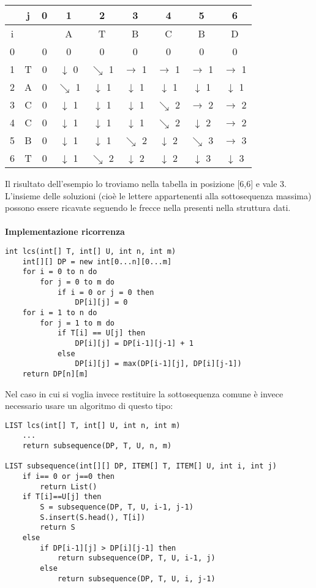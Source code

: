 \documentclass[../cheatSheetAlgoritmi.tex]{subfiles}
\begin{document}
\begin{center}
	\renewcommand{\arraystretch}{1.2}
	\begin{tabular}{ |c|c|c|c|c|c|c|c|c| } 
		\hline
			&j &0 &1 &2 &3 &4 &5 &6\\
		\hline
			i & & &A &T &B &C &B &D\\
		\hline
			0 & &0 &0 &0 &0 &0 &0 &0\\
		\hline
			1 &T &0 & $\downarrow$ 0 & $\searrow$ 1 & $\rightarrow$ 1 & $\rightarrow$ 1 & $\rightarrow$ 1 & $\rightarrow$ 1\\
		\hline
			2 &A &0 & $\searrow$ 1 & $\downarrow$ 1 & $\downarrow$ 1 & $\downarrow$ 1 & $\downarrow$ 1 & $\downarrow$ 1\\
		\hline
			3 &C &0 & $\downarrow$ 1 & $\downarrow$ 1 & $\downarrow$ 1 & $\searrow$ 2 & $\rightarrow$ 2 & $\rightarrow$ 2\\
		\hline
			4 &C &0 & $\downarrow$ 1 & $\downarrow$ 1 & $\downarrow$ 1 & $\searrow$ 2 & $\downarrow$ 2 & $\rightarrow$ 2\\
		\hline
			5 &B &0 & $\downarrow$ 1 & $\downarrow$ 1 & $\searrow$ 2 & $\downarrow$ 2 & $\searrow$ 3 & $\rightarrow$ 3\\
		\hline
			6 &T &0 & $\downarrow$ 1 & $\searrow$ 2 & $\downarrow$ 2 & $\downarrow$ 2 & $\downarrow$ 3 & $\downarrow$ 3\\
			\hline
	\end{tabular}
\end{center}
Il risultato dell'esempio lo troviamo nella tabella in posizione [6,6] e vale 3. L'insieme delle soluzioni (cioè le lettere appartenenti alla sottosequenza massima) possono essere ricavate seguendo le frecce nella presenti nella struttura dati.\\\\
\textbf{Implementazione ricorrenza}
\begin{lstlisting}[caption= Lunghezza LCS]
int lcs(int[] T, int[] U, int n, int m)
	int[][] DP = new int[0...n][0...m]
	for i = 0 to n do
		for j = 0 to m do
			if i = 0 or j = 0 then
				DP[i][j] = 0
	for i = 1 to n do
		for j = 1 to m do
			if T[i] == U[j] then
				DP[i][j] = DP[i-1][j-1] + 1
			else
				DP[i][j] = max(DP[i-1][j], DP[i][j-1])
	return DP[n][m]
\end{lstlisting}
Nel caso in cui si voglia invece restituire la sottosequenza comune è invece necessario usare un algoritmo di questo tipo:
\begin{lstlisting}[caption=Ricostruire LCS]
LIST lcs(int[] T, int[] U, int n, int m)
	...
	return subsequence(DP, T, U, n, m)
	
LIST subsequence(int[][] DP, ITEM[] T, ITEM[] U, int i, int j)
	if i== 0 or j==0 then
		return List()
	if T[i]==U[j] then
		S = subsequence(DP, T, U, i-1, j-1)
		S.insert(S.head(), T[i])
		return S
	else
		if DP[i-1][j] > DP[i][j-1] then
			return subsequence(DP, T, U, i-1, j)
		else
			return subsequence(DP, T, U, i, j-1)
\end{lstlisting}
\end{document}
